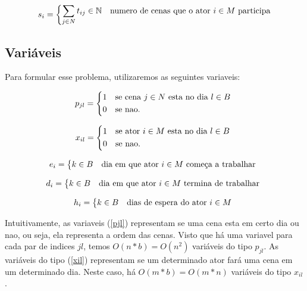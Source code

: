 \documentclass[a4paper,11pt]{article}
\begin{document}
\begin{equation}
  s_{i} = \begin{dcases*} \sum_{j \in N} t_{ij} \in \mathbb{N} & numero de cenas que o ator $i \in M$ participa\end{dcases*}
\end{equation}

\subsection{Variáveis}
Para formular esse problema, utilizaremos as seguintes variaveis:

\begin{equation}
  p_{jl} = \begin{dcases*}
              1 & se cena $j \in N$ esta no dia $l \in B$ \\
              0 & se nao.
           \end{dcases*}
  \label{pjl}
\end{equation}

\begin{equation}
  x_{il} = \begin{dcases*}
              1 & se ator $i \in M$ esta no dia $l \in B$ \\
              0 & se nao.
           \end{dcases*}
  \label{xil}
\end{equation}

\begin{equation}
  e_{i} = \begin{dcases*} k \in B & dia em que ator $i \in M$ começa a trabalhar \end{dcases*}
  \label{ei}
\end{equation}

\begin{equation}
  d_{i} = \begin{dcases*} k \in B & dia em que ator $i \in M$ termina de trabalhar \end{dcases*}
  \label{di}
\end{equation}

\begin{equation}
  h_{i} = \begin{dcases*} k \in B & dias de espera do ator $i \in M$ \end{dcases*}
  \label{hi}
\end{equation}

Intuitivamente, as variaveis (\ref{pjl}) representam se uma cena esta em certo dia
ou nao, ou seja, ela representa a ordem das cenas. Visto que há uma variavel para
cada par de indices $jl$, temos $O(n*b) = O(n^2)$ variáveis do tipo $p_{jl}$. As
variáveis do tipo (\ref{xil}) representam se um determinado ator fará uma cena
em um determinado dia. Neste caso, há $O(m*b) = O(m*n)$ variáveis do tipo $x_{il}$.
\end{document}
